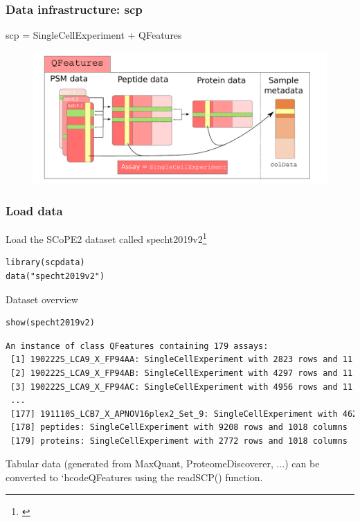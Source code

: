 \documentclass{beamer}
\newcommand{\hcode}[2][lgray]{{\ttfamily\color{vdgray}\colorbox{#1}{#2}}}
\newcommand{\frametitlesection}[1]{\frametitle{\centering #1 \footnotesize \hspace{0pt plus 1 filll} \insertsection}}
\begin{document}
\begin{frame}
    \frametitlesection{Data infrastructure: scp}

    \hcode{scp} = \hcode{SingleCellExperiment} + \hcode{QFeatures}
    \begin{figure}
        \centering
        \includegraphics[width=\linewidth]{figs/SCP_framework.pdf}
    \end{figure}

    
\end{frame}

\begin{frame}[fragile]
    \frametitlesection{Load data}
    
    Load the SCoPE2 dataset called \hcode{specht2019v2}\footnote{\citet{Specht2019-jm}}
    
    \begin{lstlisting}
library(scpdata)
data("specht2019v2")
    \end{lstlisting}
    
    Dataset overview
    
    \begin{lstlisting}
show(specht2019v2)
    \end{lstlisting}
    
    \begin{lstlisting}[language = TeX, numbers = none, basicstyle = \tiny\ttfamily\color{vdgray}]
An instance of class QFeatures containing 179 assays:
 [1] 190222S_LCA9_X_FP94AA: SingleCellExperiment with 2823 rows and 11 col...
 [2] 190222S_LCA9_X_FP94AB: SingleCellExperiment with 4297 rows and 11 col...
 [3] 190222S_LCA9_X_FP94AC: SingleCellExperiment with 4956 rows and 11 col...
 ...
 [177] 191110S_LCB7_X_APNOV16plex2_Set_9: SingleCellExperiment with 4626 r...
 [178] peptides: SingleCellExperiment with 9208 rows and 1018 columns
 [179] proteins: SingleCellExperiment with 2772 rows and 1018 columns
    \end{lstlisting}
    
    \bigskip
    \footnotesize
    
    Tabular data (generated from MaxQuant, ProteomeDiscoverer,
    ...) can be converted to `hcode{QFeatures} using the \hcode{readSCP()} function.
    
\end{frame}
\end{document}
